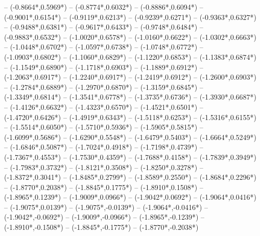 {	-- ({-0.8664*\dx},{0.5969*\dy})
	-- ({-0.8774*\dx},{0.6032*\dy})
	-- ({-0.8886*\dx},{0.6094*\dy})
	-- ({-0.9001*\dx},{0.6154*\dy})
	-- ({-0.9119*\dx},{0.6213*\dy})
	-- ({-0.9239*\dx},{0.6271*\dy})
	-- ({-0.9363*\dx},{0.6327*\dy})
	-- ({-0.9488*\dx},{0.6381*\dy})
	-- ({-0.9617*\dx},{0.6433*\dy})
	-- ({-0.9748*\dx},{0.6484*\dy})
	-- ({-0.9883*\dx},{0.6532*\dy})
	-- ({-1.0020*\dx},{0.6578*\dy})
	-- ({-1.0160*\dx},{0.6622*\dy})
	-- ({-1.0302*\dx},{0.6663*\dy})
	-- ({-1.0448*\dx},{0.6702*\dy})
	-- ({-1.0597*\dx},{0.6738*\dy})
	-- ({-1.0748*\dx},{0.6772*\dy})
	-- ({-1.0903*\dx},{0.6802*\dy})
	-- ({-1.1060*\dx},{0.6829*\dy})
	-- ({-1.1220*\dx},{0.6853*\dy})
	-- ({-1.1383*\dx},{0.6874*\dy})
	-- ({-1.1549*\dx},{0.6890*\dy})
	-- ({-1.1718*\dx},{0.6903*\dy})
	-- ({-1.1889*\dx},{0.6912*\dy})
	-- ({-1.2063*\dx},{0.6917*\dy})
	-- ({-1.2240*\dx},{0.6917*\dy})
	-- ({-1.2419*\dx},{0.6912*\dy})
	-- ({-1.2600*\dx},{0.6903*\dy})
	-- ({-1.2784*\dx},{0.6889*\dy})
	-- ({-1.2970*\dx},{0.6870*\dy})
	-- ({-1.3159*\dx},{0.6845*\dy})
	-- ({-1.3349*\dx},{0.6814*\dy})
	-- ({-1.3541*\dx},{0.6778*\dy})
	-- ({-1.3735*\dx},{0.6736*\dy})
	-- ({-1.3930*\dx},{0.6687*\dy})
	-- ({-1.4126*\dx},{0.6632*\dy})
	-- ({-1.4323*\dx},{0.6570*\dy})
	-- ({-1.4521*\dx},{0.6501*\dy})
	-- ({-1.4720*\dx},{0.6426*\dy})
	-- ({-1.4919*\dx},{0.6343*\dy})
	-- ({-1.5118*\dx},{0.6253*\dy})
	-- ({-1.5316*\dx},{0.6155*\dy})
	-- ({-1.5514*\dx},{0.6050*\dy})
	-- ({-1.5710*\dx},{0.5936*\dy})
	-- ({-1.5905*\dx},{0.5815*\dy})
	-- ({-1.6099*\dx},{0.5686*\dy})
	-- ({-1.6290*\dx},{0.5548*\dy})
	-- ({-1.6479*\dx},{0.5403*\dy})
	-- ({-1.6664*\dx},{0.5249*\dy})
	-- ({-1.6846*\dx},{0.5087*\dy})
	-- ({-1.7024*\dx},{0.4918*\dy})
	-- ({-1.7198*\dx},{0.4739*\dy})
	-- ({-1.7367*\dx},{0.4553*\dy})
	-- ({-1.7530*\dx},{0.4359*\dy})
	-- ({-1.7688*\dx},{0.4158*\dy})
	-- ({-1.7839*\dx},{0.3949*\dy})
	-- ({-1.7983*\dx},{0.3732*\dy})
	-- ({-1.8121*\dx},{0.3508*\dy})
	-- ({-1.8250*\dx},{0.3278*\dy})
	-- ({-1.8372*\dx},{0.3041*\dy})
	-- ({-1.8485*\dx},{0.2799*\dy})
	-- ({-1.8589*\dx},{0.2550*\dy})
	-- ({-1.8684*\dx},{0.2296*\dy})
	-- ({-1.8770*\dx},{0.2038*\dy})
	-- ({-1.8845*\dx},{0.1775*\dy})
	-- ({-1.8910*\dx},{0.1508*\dy})
	-- ({-1.8965*\dx},{0.1239*\dy})
	-- ({-1.9009*\dx},{0.0966*\dy})
	-- ({-1.9042*\dx},{0.0692*\dy})
	-- ({-1.9064*\dx},{0.0416*\dy})
	-- ({-1.9075*\dx},{0.0139*\dy})
	-- ({-1.9075*\dx},{-0.0139*\dy})
	-- ({-1.9064*\dx},{-0.0416*\dy})
	-- ({-1.9042*\dx},{-0.0692*\dy})
	-- ({-1.9009*\dx},{-0.0966*\dy})
	-- ({-1.8965*\dx},{-0.1239*\dy})
	-- ({-1.8910*\dx},{-0.1508*\dy})
	-- ({-1.8845*\dx},{-0.1775*\dy})
	-- ({-1.8770*\dx},{-0.2038*\dy})
}

